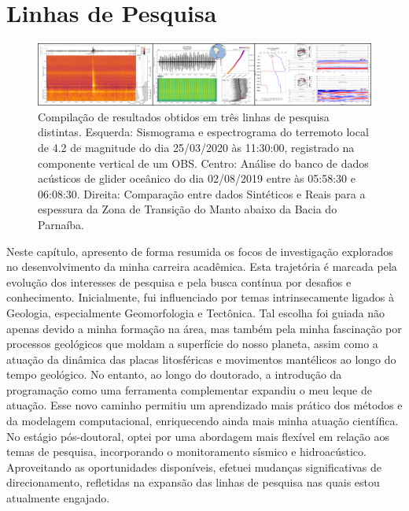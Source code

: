 \documentclass[10pt,a4paper,oneside]{book}
\newcommand{\HeroFigPad}{\vspace{-1cm}}
\begin{document}

\chapter{Linhas de Pesquisa}
\label{cap_pesquisa}

\begin{figure}[h]
  \HeroFigPad
  \begin{center}
    \includegraphics[width=\textwidth]{images/linhas_de_pesquisa.png}
  \end{center}
  \caption{
    Compilação de resultados obtidos em três linhas de pesquisa distintas. Esquerda: Sismograma e espectrograma do terremoto local de 4.2 de magnitude do dia 25/03/2020 às 11:30:00, registrado na componente vertical de um OBS. Centro: Análise do banco de dados acústicos de glider oceânico do dia 02/08/2019 entre às 05:58:30 e 06:08:30. Direita: Comparação entre dados Sintéticos e Reais para a  espessura da Zona de Transição do Manto abaixo da Bacia do Parnaíba.
  }
\end{figure}

Neste capítulo, apresento de forma resumida os focos de investigação explorados no desenvolvimento da minha carreira acadêmica. Esta trajetória é marcada pela evolução dos interesses de pesquisa e pela busca contínua por desafios e conhecimento. Inicialmente, fui influenciado por temas intrinsecamente ligados à Geologia, especialmente Geomorfologia e Tectônica. Tal escolha foi guiada não apenas devido a minha formação na área, mas também pela minha fascinação por processos geológicos que moldam a superfície do nosso planeta, assim como a atuação da dinâmica das placas litosféricas e movimentos mantélicos ao longo do tempo geológico. No entanto, ao longo do doutorado, a introdução da programação como uma ferramenta complementar expandiu o meu leque de atuação. Esse novo caminho permitiu um aprendizado mais prático dos métodos e da modelagem computacional, enriquecendo ainda mais minha atuação científica. No estágio pós-doutoral, optei por uma abordagem mais flexível em relação aos temas de pesquisa, incorporando o monitoramento sísmico e hidroacústico. Aproveitando as oportunidades disponíveis, efetuei mudanças significativas de direcionamento, refletidas na expansão das linhas de pesquisa nas quais estou atualmente engajado. 
\end{document}
